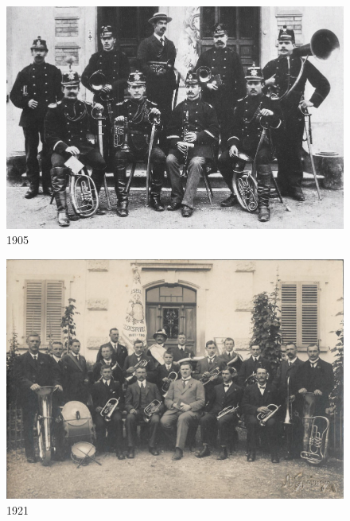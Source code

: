 \documentclass[openany]{book}
\begin{document}
\begin{figure}
    \centerline{\includegraphics{./chap/1900-1925/MGH-1905.jpg}}
    \label{fig:mgh-1905}
    \caption{1905}
\end{figure}
\begin{figure}[ht]
    \centerline{\includegraphics{./chap/1900-1925/MGH-1921.jpg}}
    \label{fig:mgh-1921}
    \caption{1921}
\end{figure}

\end{document}
